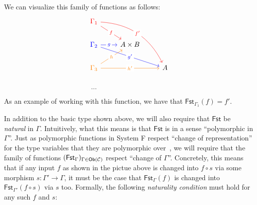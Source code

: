 We can visualize this family of functions as follows:
\begin{equation}
\begin{tikzcd}
  {\color{red} \Gamma_1} \arrow[rd, "f" description, color = red] \arrow[rrdd, "f'" description, bend left, color = red] &             &   \\
  {\color{blue}\Gamma_2} \arrow[r, "g" description, color = blue] \arrow[rrd, "g'" description, color = blue]              & A \times B  &   \\
  {\color{orange} \Gamma_3} \arrow[ru, "h" description, color = orange] \arrow[rr, "h'" description, color = orange]              &             & A \\
  ...                                                                               &             &  
  \end{tikzcd}
  \label{cd:indexed-fam}
\end{equation}
As an example of working with this function, we have that
$\mathsf{Fst}_{\Gamma_1}(f) = f'$.

In addition to the basic type shown above, we will also require that \(\mathsf{Fst}\)
be \emph{natural} in \(\Gamma\).
Intuitively, what this means is that \(\mathsf{Fst}\) is in a sense ``polymorphic in \(\Gamma\)''.
Just as polymorphic functions in System F
respect ``change of representation'' for the type variables that they are polymorphic over~\citep{reynolds1983types},
we will require that the family of functions \((\mathsf{Fst}_\Gamma)_{\Gamma\in\mathsf{Ob}(\mathcal C)}\)
respect ``change of \(\Gamma\)''.
Concretely, this means that if any input \(f\) as shown in the pictue above is changed into \(f \circ s\) via some morphism
$s : \Gamma' \to \Gamma$,
it must be the case that \(\mathsf{Fst}_\Gamma(f)\) is changed into \(\mathsf{Fst}_{\Gamma'}(f\circ s)\)
via \(s\) too. Formally, the following \emph{naturality condition} must hold for any such \(f\) and \(s\):

